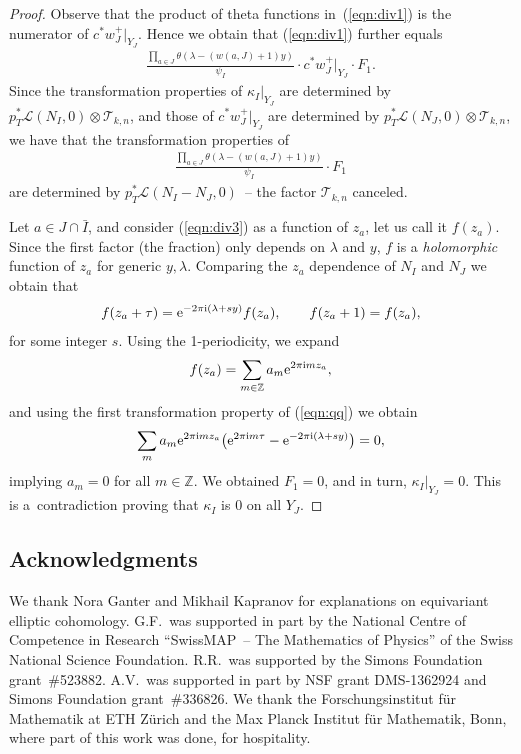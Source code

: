 \documentclass[10pt,a4paper]{amsart}
\numberwithin{equation}{section}
\begin{document}
\begin{proof}
Observe that the product of theta functions in~(\ref{eqn:div1}) is the numerator of $c ^*w_J^+|_{Y_J}$. Hence we obtain that (\ref{eqn:div1}) further equals
\begin{gather*}
\frac{\prod\limits_{a\in J} \theta(\lambda-(w(a,J)+1)y)}{\psi_I} \cdot c ^*w_J^+|_{Y_J} \cdot F_1.
\end{gather*}
Since the transformation properties of $\kappa_I|_{Y_J}$ are determined by $p_T^*\mathcal L(N_I,0)\otimes \mathcal T_{k,n}$, and those of $c ^* w_J^+|_{Y_J}$ are determined by $p_T^*\mathcal L(N_J,0)\otimes \mathcal T_{k,n}$, we have that the transformation properties of
\begin{gather}\label{eqn:div3}
\frac{\prod\limits_{a\in J} \theta(\lambda-(w(a,J)+1)y)}{\psi_I} \cdot F_1
\end{gather}
are determined by $p_T^*\mathcal L(N_I-N_J,0)$~-- the factor $\mathcal T_{k,n}$ canceled.

Let $a\in J \cap \bar{I}$, and consider (\ref{eqn:div3}) as a function of $z_a$, let us call it $f(z_a)$. Since the first factor (the fraction) only depends on $\lambda$ and $y$, $f$ is a {\em holomorphic} function of $z_a$ for generic $y,\lambda$. Comparing the $z_a$ dependence of $N_I$ and $N_J$ we obtain that
\begin{gather}\label{eqn:qq}
f(z_a+\tau)={\rm e}^{-2\pi{\rm i} (\lambda+sy)} f(z_a), \qquad f(z_a+1)=f(z_a),
\end{gather}
for some integer $s$. Using the 1-periodicity, we expand
\begin{gather*}
f(z_a)=\sum_{m\in \mathbb Z} a_m {\rm e}^{2\pi{\rm i} m z_a},
\end{gather*}
and using the first transformation property of (\ref{eqn:qq}) we obtain
\begin{gather*}
\sum_m a_m {\rm e}^{2\pi{\rm i} m z_a} \big( {\rm e}^{2\pi{\rm i} m \tau} - {\rm e}^{-2\pi{\rm i} (\lambda+sy)} \big)=0,
\end{gather*}
implying $a_m=0$ for all $m\in \mathbb Z$. We obtained $F_1=0$, and in turn, $\kappa_I|_{Y_J}=0$. This is a~contradiction proving that $\kappa_I$ is 0 on all $Y_J$.
\end{proof}

\subsection*{Acknowledgments} We thank Nora Ganter and Mikhail Kapranov for explanations on equivariant elliptic co\-ho\-mo\-logy. G.F.\ was supported in part by the National Centre of Competence in Research ``SwissMAP~-- The Mathematics of Physics'' of the Swiss National Science Foundation. R.R.\ was supported by the Simons Foundation grant~\#523882. A.V.\ was supported in part by NSF grant DMS-1362924 and Simons Foundation grant~\#336826. We thank the Forschungsinstitut f\"ur Mathematik at ETH Z\"urich and the Max Planck Institut f\"ur Mathematik, Bonn, where part of this work was done, for hospitality.
\end{document}
